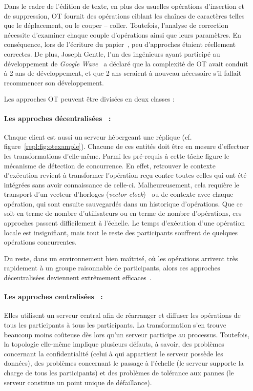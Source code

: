 Dans le cadre de l'édition de texte, en plus des usuelles opérations d'insertion
et de suppression, OT fournit des opérations ciblant les chaînes de caractères
telles que le déplacement, ou le couper -- coller. Toutefois, l'analyse de
correction nécessite d'examiner chaque couple d'opérations ainsi que leurs
paramètres. En conséquence, lors de l'écriture du
papier~\cite{imine2003proving}, peu d'approches étaient réellement correctes.
De plus, Joseph Gentle, l'un des ingénieurs ayant participé au développement de
\emph{Google Wave}~\cite{googlewave, kaewkitipong2012diffusion} a déclaré que la
complexité de OT avait conduit à 2 ans de développement, et que 2 ans seraient à
nouveau nécessaire s'il fallait recommencer son développement.

\noindent Les approches OT peuvent être divisées en deux classes :

\paragraph{Les approches décentralisées~\cite{sun2009contextbased} :}
Chaque client est aussi un serveur hébergeant une réplique
(cf. figure~\ref{repl:fig:otexample}). Chacune de ces entités doit être en
mesure d'effectuer les transformations d'elle-même. Parmi les pré-requis à cette
tâche figure le mécanisme de détection de concurrence. En effet, retrouver le
contexte d'exécution revient à transformer l'opération reçu contre toutes celles
qui ont été intégrées sans avoir connaissance de celle-ci. Malheureusement, cela
requière le transport d'un vecteur d'horloges (\emph{vector
  clock})~\cite{lamport1978time} ou de contexte avec chaque opération, qui sont
ensuite sauvegardés dans un historique d'opérations. Que ce soit en terme de
nombre d'utilisateurs ou en terme de nombre d'opérations, ces approches passent
difficilement à l'échelle. Le temps d'exécution d'une opération locale est
insignifiant, mais tout le reste des participants souffrent de quelques
opérations concurrentes.

\noindent Du reste, dans un environnement bien maîtrisé, où les opérations
arrivent très rapidement à un groupe raisonnable de participants, alors ces
approches décentralisées deviennent extrêmement
efficaces~\cite{mehdi2014merging}.

\paragraph{Les approches centralisées~\cite{nichols1995high} :} Elles utilisent
un serveur central afin de réarranger et diffuser les opérations de tous les
participants à tous les participants. La transformation s'en trouve beaucoup
moins coûteuse dès lors qu'un serveur participe au processus. Toutefois, la
topologie elle-même implique plusieurs défauts, à savoir, des problèmes
concernant la confidentialité (celui à qui appartient le serveur possède les
données), des problèmes concernant le passage à l'échelle (le serveur supporte
la charge de tous les participants) et des problèmes de tolérance aux pannes (le
serveur constitue un point unique de défaillance).

